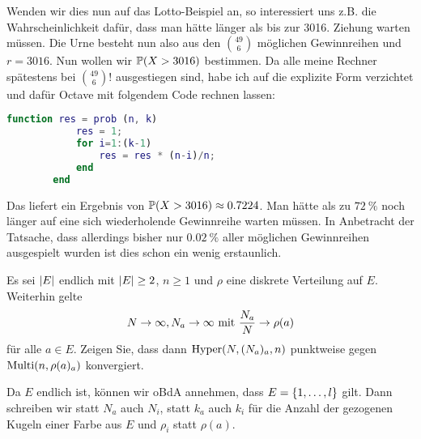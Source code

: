 \begin{exercisePage}
	Wenden wir dies nun auf das Lotto-Beispiel an, so interessiert uns z.B. die Wahrscheinlichkeit dafür, dass man hätte länger als bis zur 3016. Ziehung warten müssen. Die Urne besteht nun also aus den $\binom{49}{6}$ möglichen Gewinnreihen und $r=3016$.
	Nun wollen wir $\P(X>3016)$ bestimmen. Da alle meine Rechner spätestens bei $\binom{49}{6} !$ ausgestiegen sind, habe ich auf die explizite Form verzichtet und dafür Octave mit folgendem Code rechnen lassen:
	\begin{lstlisting}[language=Matlab]
		function res = prob (n, k)
			res = 1;
			for i=1:(k-1)
				res = res * (n-i)/n;
			end
		end
	\end{lstlisting}
	Das liefert ein Ergebnis von $\P(X>3016) \approx 0.7224$. Man hätte als zu $72~\%$ noch länger auf eine sich wiederholende Gewinnreihe warten müssen. In Anbetracht der Tatsache, dass allerdings bisher nur $0.02~\%$ aller möglichen Gewinnreihen ausgespielt wurden ist dies schon ein wenig erstaunlich.
	
	

	\begin{exercise}
		Es sei $\card{E}$ endlich mit $\card{E} \geq 2$, $n \geq 1$ und $\rho$ eine diskrete Verteilung auf $E$. Weiterhin gelte 
		\begin{align} \label{eq: 2_2_konvggrho}
			N \to \infty , N_a \to \infty \mit \frac{N_a}{N} \to \rho(a) 
		\end{align} 
		für alle $a \in E$. Zeigen Sie, dass dann $\Hyper(N, (N_a)_a, n)$ punktweise gegen $\Multi(n, \rho(a)_a)$ konvergiert.
	\end{exercise}

	Da $E$ endlich ist, können wir oBdA annehmen, dass $E = \menge{1, \dots , l}$ gilt. Dann schreiben wir statt $N_a$ auch $N_i$, statt $k_a$ auch $k_i$ für die Anzahl der gezogenen Kugeln einer Farbe aus $E$ und $\rho_i$ statt $\rho(a)$. 
	

\end{exercisePage}
